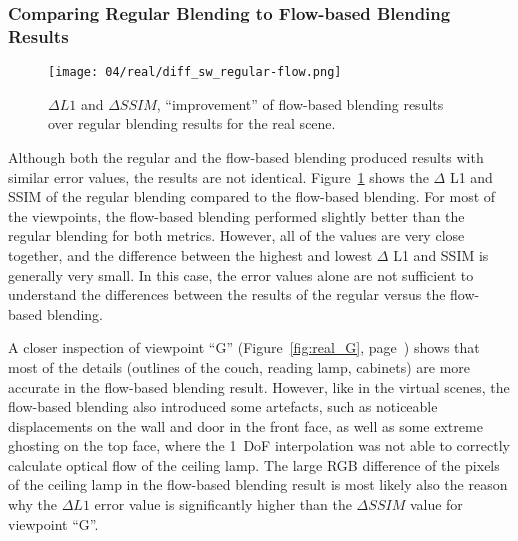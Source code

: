 \subsubsection{Comparing Regular Blending to Flow-based Blending Results}
\begin{figure}
		\centering
		\texttt{[image: 04/real/diff\_sw\_regular-flow.png]}
		\caption{$\Delta L1$ and $\Delta SSIM$, ``improvement'' of flow-based blending results over regular blending results for the real scene.}
		\label{fig:real_diff}
\end{figure}

Although both the regular and the flow-based blending produced results with similar error values, the results are not identical. 
%
Figure~\ref{fig:real_diff} shows the $\Delta$ L1 and SSIM of the regular blending compared to the flow-based blending.
For most of the viewpoints, the flow-based blending performed slightly better than the regular blending for both metrics. However, all of the values are very close together, and the difference between the highest and lowest $\Delta$ L1 and SSIM is generally very small. In this case, the error values alone are not sufficient to understand the differences between the results of the regular versus the flow-based blending.

A closer inspection of viewpoint ``G'' (Figure~\ref{fig:real_G}, page~\pageref{fig:real_G}) shows that most of the details (outlines of the couch, reading lamp, cabinets) are more accurate in the flow-based blending result. However, like in the virtual scenes, the flow-based blending also introduced some artefacts, such as noticeable displacements on the wall and door in the front face, as well as some extreme ghosting on the top face, where the 1~DoF interpolation was not able to correctly calculate optical flow of the ceiling lamp. The large RGB difference of the pixels of the ceiling lamp in the flow-based blending result is most likely also the reason why the $\Delta L1$ error value is significantly higher than the $\Delta SSIM$ value for viewpoint ``G''.

